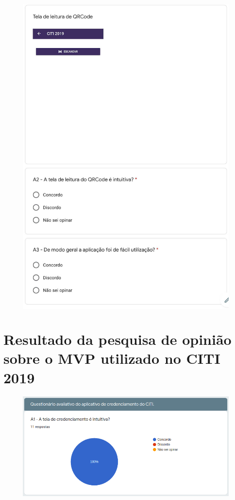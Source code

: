 \begin{figure}[H]
    \centering
    \includegraphics[scale=0.35]{figuras/questionario2.jpg}
\end{figure}

\chapter{Resultado da pesquisa de opinião sobre o MVP utilizado no CITI 2019}\label{apendice2}

\begin{figure}[H]
    \centering
    \includegraphics[scale=0.55]{figuras/form1.png}
\end{figure}

